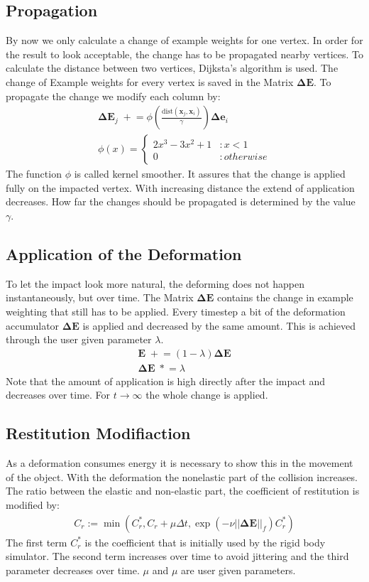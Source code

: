 \documentclass[
	11pt, 
	DIV10,
	a4paper, 
	oneside, 
	headings=normal, 
	captions=tableheading,
	final, 
	numbers=noenddot
]{scrartcl}
\begin{document}
\subsection{Propagation}
By now we only calculate a change of example weights for one vertex. In order for the result to look acceptable, the change has to be propagated nearby vertices. To calculate the distance between two vertices, Dijksta's algorithm is used. The change of Example weights for every vertex is saved in the Matrix $\bm{\Delta E}$. To propagate the change we modify each column by:
\begin{align}
\bm{\Delta E}_j \;+\!\!= \phi\left(\frac{\text{dist}(\bm x_j , \bm x_i)}{\gamma}\right) \bm{\Delta e}_i\\
\phi(x) =
\begin{cases}
2x^3 - 3x^2 + 1 & : x< 1\\
0               & : otherwise	
\end{cases}
\end{align}
The function $\phi$ is called kernel smoother. It assures that the change is applied fully on the impacted vertex. With increasing distance the extend of application decreases. How far the changes should be propagated is determined by the value $\gamma$.
\subsection{Application of the Deformation}
To let the impact look more natural, the deforming does not happen instantaneously, but over time. The Matrix $\bm{\Delta E}$ contains the change in example weighting that still has to be applied. Every timestep a bit of the deformation accumulator  $\bm{\Delta E}$ is applied and decreased by the same amount. This is achieved through the user given parameter $\lambda$.
\begin{align}
\bm E \;+\!\!= (1-\lambda)\bm{\Delta E} \\
\bm {\Delta E} \;*\!\!= \lambda
\end{align}
Note that the amount of application is high directly after the impact and decreases over time. For $t\rightarrow\infty$ the whole change is applied.
\subsection{Restitution Modifiaction}
As a deformation consumes energy it is necessary to show this in the movement of the object. With the deformation the nonelastic part of the collision increases. The ratio between the elastic and non-elastic part, the coefficient of restitution is modified by:
\begin{align}
C_r := \min(C_r^*, C_r + \mu \Delta t, \exp(-\nu||\bm{\Delta E}||_f)C_r^*)
\end{align}
The first term $C_r^*$ is the coefficient that is initially used by the rigid body simulator. The second term increases over time to avoid jittering and the third parameter decreases over time. $\mu$ and $\mu$ are user given parameters.
\end{document}

